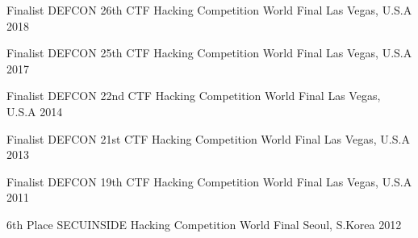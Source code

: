 



\begin{cvhonors}

  \cvhonor
  {Finalist} %
  {DEFCON 26th CTF Hacking Competition World Final} %
  {Las Vegas, U.S.A} %
  {2018} %

  \cvhonor
  {Finalist} %
  {DEFCON 25th CTF Hacking Competition World Final} %
  {Las Vegas, U.S.A} %
  {2017} %

  \cvhonor
  {Finalist} %
  {DEFCON 22nd CTF Hacking Competition World Final} %
  {Las Vegas, U.S.A} %
  {2014} %

  \cvhonor
  {Finalist} %
  {DEFCON 21st CTF Hacking Competition World Final} %
  {Las Vegas, U.S.A} %
  {2013} %

  \cvhonor
  {Finalist} %
  {DEFCON 19th CTF Hacking Competition World Final} %
  {Las Vegas, U.S.A} %
  {2011} %

  \cvhonor
  {6th Place} %
  {SECUINSIDE Hacking Competition World Final} %
  {Seoul, S.Korea} %
  {2012} %

\end{cvhonors}




